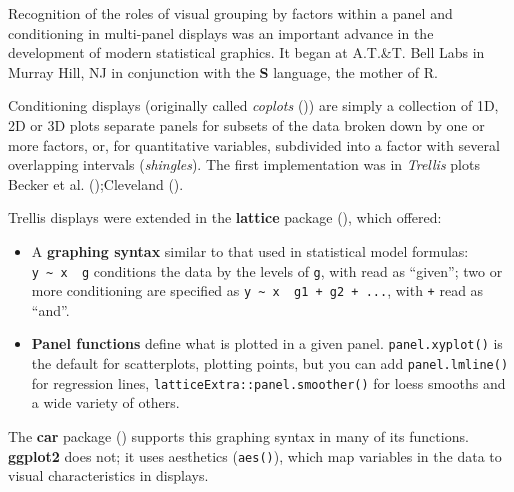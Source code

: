 \documentclass[
  letterpaper,
  10pt,
  krantz2]{krantz}
\providecommand{\tightlist}{%
  \setlength{\itemsep}{0pt}\setlength{\parskip}{0pt}}\usepackage{longtable,booktabs,array}
\begin{document}
\begin{tcolorbox}[enhanced jigsaw, colback=white, titlerule=0mm, toprule=.15mm, opacityback=0, leftrule=.75mm, opacitybacktitle=0.6, left=2mm, arc=.35mm, colframe=quarto-callout-note-color-frame, breakable, bottomtitle=1mm, toptitle=1mm, title=\textcolor{quarto-callout-note-color}{\faInfo}\hspace{0.5em}{History Corner}, rightrule=.15mm, bottomrule=.15mm, coltitle=black, colbacktitle=quarto-callout-note-color!10!white]

Recognition of the roles of visual grouping by factors within a panel
and conditioning in multi-panel displays was an important advance in the
development of modern statistical graphics. It began at A.T.\&T. Bell
Labs in Murray Hill, NJ in conjunction with the \textbf{S} language, the
mother of R.

Conditioning displays (originally called \emph{coplots}
()) are
simply a collection of 1D, 2D or 3D plots separate panels for subsets of
the data broken down by one or more factors, or, for quantitative
variables, subdivided into a factor with several overlapping intervals
(\emph{shingles}). The first implementation was in \emph{Trellis} plots
Becker et al. ();Cleveland
().

Trellis displays were extended in the \textbf{lattice} package
(), which offered:

\begin{itemize}
\tightlist
\item
  A \textbf{graphing syntax} similar to that used in statistical model
  formulas: \texttt{y\ \textasciitilde{}\ x\ \textbar{}\ g} conditions
  the data by the levels of \texttt{g}, with \texttt{\textbar{}} read as
  ``given''; two or more conditioning are specified as
  \texttt{y\ \textasciitilde{}\ x\ \textbar{}\ g1\ +\ g2\ +\ ...}, with
  \texttt{+} read as ``and''.
\item
  \textbf{Panel functions} define what is plotted in a given panel.
  \texttt{panel.xyplot()} is the default for scatterplots, plotting
  points, but you can add \texttt{panel.lmline()} for regression lines,
  \texttt{latticeExtra::panel.smoother()} for loess smooths and a wide
  variety of others.
\end{itemize}

The \textbf{car} package ()
supports this graphing syntax in many of its functions. \textbf{ggplot2}
does not; it uses aesthetics (\texttt{aes()}), which map variables in
the data to visual characteristics in displays.

\end{tcolorbox}
\end{document}
